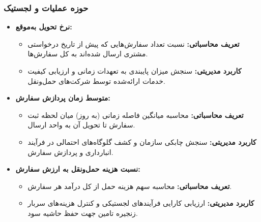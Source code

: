 \documentclass[14pt,a4paper]{extarticle}
\begin{document}
	\subsubsection{حوزه عملیات و لجستیک}
	\begin{itemize}
		\item \textbf{نرخ تحویل به‌موقع:}
		\begin{itemize}
			\item \textbf{تعریف محاسباتی:} نسبت تعداد سفارش‌هایی که پیش از تاریخ درخواستی مشتری ارسال شده‌اند به کل سفارش‌ها.
			\item \textbf{کاربرد مدیریتی:} سنجش میزان پایبندی به تعهدات زمانی و ارزیابی کیفیت خدمات ارائه‌شده توسط شرکت‌های حمل‌ونقل.
		\end{itemize}
		
		\item \textbf{متوسط زمان پردازش سفارش:}
		\begin{itemize}
			\item \textbf{تعریف محاسباتی:} محاسبه میانگین فاصله زمانی (به روز) میان لحظه ثبت سفارش تا تحویل آن به واحد ارسال.
			\item \textbf{کاربرد مدیریتی:} سنجش چابکی سازمان و کشف گلوگاه‌های احتمالی در فرآیند انبارداری و پردازش سفارش.
		\end{itemize}
		
		\item \textbf{نسبت هزینه حمل‌ونقل به ارزش سفارش:}
		\begin{itemize}
			\item \textbf{تعریف محاسباتی:} محاسبه سهم هزینه حمل از کل درآمد هر سفارش.
			\item \textbf{کاربرد مدیریتی:} ارزیابی کارایی فرآیندهای لجستیکی و کنترل هزینه‌های سربار زنجیره تامین جهت حفظ حاشیه سود.
		\end{itemize}
	\end{itemize}
	
\end{document}
